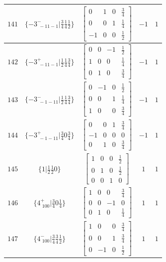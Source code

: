\documentclass[fleqn,8pt]{jsarticle}
\begin{document}
\begin{longtable}{ccccc}
$ 141 $ & $ \{-3^{-}_{\,\,-11-1}|\frac{3}{4} \frac{1}{4} \frac{1}{2}\} $ & $ \begin{bmatrix} 0 & 1 & 0 & \frac{3}{4} \\ 0 & 0 & 1 & \frac{1}{4} \\ -1 & 0 & 0 & \frac{1}{2} \end{bmatrix} $ & $ -1 $ & $ 1 $ \\ \hline
$ 142 $ & $ \{-3^{+}_{\,\,-11-1}|\frac{1}{2} \frac{1}{4} \frac{3}{4}\} $ & $ \begin{bmatrix} 0 & 0 & -1 & \frac{1}{2} \\ 1 & 0 & 0 & \frac{1}{4} \\ 0 & 1 & 0 & \frac{3}{4} \end{bmatrix} $ & $ -1 $ & $ 1 $ \\ \hline
$ 143 $ & $ \{-3^{-}_{\,\,-1-11}|\frac{1}{2} \frac{1}{4} \frac{3}{4}\} $ & $ \begin{bmatrix} 0 & -1 & 0 & \frac{1}{2} \\ 0 & 0 & 1 & \frac{1}{4} \\ 1 & 0 & 0 & \frac{3}{4} \end{bmatrix} $ & $ -1 $ & $ 1 $ \\ \hline
$ 144 $ & $ \{-3^{+}_{\,\,-1-11}|\frac{3}{4} 0 \frac{3}{4}\} $ & $ \begin{bmatrix} 0 & 0 & 1 & \frac{3}{4} \\ -1 & 0 & 0 & 0 \\ 0 & 1 & 0 & \frac{3}{4} \end{bmatrix} $ & $ -1 $ & $ 1 $ \\ \hline
$ 145 $ & $ \{1|\frac{1}{2} \frac{1}{2} 0\} $ & $ \begin{bmatrix} 1 & 0 & 0 & \frac{1}{2} \\ 0 & 1 & 0 & \frac{1}{2} \\ 0 & 0 & 1 & 0 \end{bmatrix} $ & $ 1 $ & $ 1 $ \\ \hline
$ 146 $ & $ \{4^{+}_{\,\,100}|\frac{3}{4} 0 \frac{1}{4}\} $ & $ \begin{bmatrix} 1 & 0 & 0 & \frac{3}{4} \\ 0 & 0 & -1 & 0 \\ 0 & 1 & 0 & \frac{1}{4} \end{bmatrix} $ & $ 1 $ & $ 1 $ \\ \hline
$ 147 $ & $ \{4^{-}_{\,\,100}|\frac{3}{4} \frac{3}{4} \frac{1}{2}\} $ & $ \begin{bmatrix} 1 & 0 & 0 & \frac{3}{4} \\ 0 & 0 & 1 & \frac{3}{4} \\ 0 & -1 & 0 & \frac{1}{2} \end{bmatrix} $ & $ 1 $ & $ 1 $ \\ \hline

\end{longtable}
\end{document}
